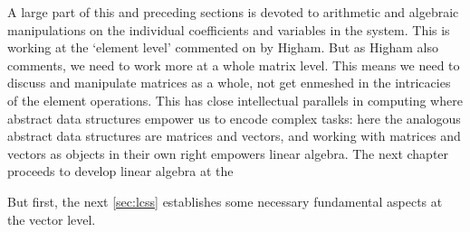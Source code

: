 A large part of this and preceding sections is devoted to arithmetic and algebraic manipulations on the individual coefficients and variables in the system. 
This is working at the `element level' commented on by Higham.
But as Higham also comments, we need to work more at a whole matrix level.
This means we need to discuss and manipulate matrices as a whole, not  get enmeshed in the intricacies of the element operations.
This has close intellectual parallels in computing where abstract data structures empower us to encode complex tasks: here the analogous abstract data structures are matrices and vectors, and working with matrices and vectors as objects in their own right empowers linear algebra.
The next chapter proceeds to develop linear algebra at the 

But first, the next \cref{sec:lcss} establishes some necessary fundamental aspects at the vector level.




\sectionExercises



